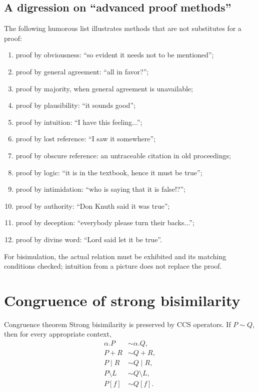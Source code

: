 \documentclass[a4paper]{article}
\begin{document}
\subsection{A digression on ``advanced proof methods''}

The following humorous list illustrates methods that are not substitutes for a proof:
\begin{enumerate}
    \item proof by obviousness: ``so evident it needs not to be mentioned'';
    \item proof by general agreement: ``all in favor?'';
    \item proof by majority, when general agreement is unavailable;
    \item proof by plausibility: ``it sounds good'';
    \item proof by intuition: ``I have this feeling...'';
    \item proof by lost reference: ``I saw it somewhere'';
    \item proof by obscure reference: an untraceable citation in old proceedings;
    \item proof by logic: ``it is in the textbook, hence it must be true'';
    \item proof by intimidation: ``who is saying that it is false!?'';
    \item proof by authority: ``Don Knuth said it was true'';
    \item proof by deception: ``everybody please turn their backs...'';
    \item proof by divine word: ``Lord said let it be true''.
\end{enumerate}
For bisimulation, the actual relation must be exhibited and its matching conditions checked; intuition from a picture does not replace the proof.

\section{Congruence of strong bisimilarity}

\begin{snippettheorem}{Congruence theorem}
    Strong bisimilarity is preserved by CCS operators.
    If \(P\sim Q\), then for every appropriate context,
    \begin{align*}
        \alpha.P&\sim\alpha.Q,\\
        P+R&\sim Q+R,\\
        P\mid R&\sim Q\mid R,\\
        P\setminus L&\sim Q\setminus L,\\
        P[f]&\sim Q[f].
    \end{align*}
\end{snippettheorem}
\end{document}
